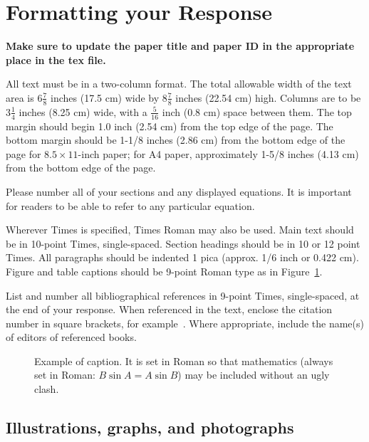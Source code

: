 \documentclass[rebuttal]{cvpr}
\begin{document}
\section{Formatting your Response}

{\bf Make sure to update the paper title and paper ID in the appropriate place in the tex file.}

All text must be in a two-column format. The total allowable width of the text
area is $6\frac78$ inches (17.5 cm) wide by $8\frac78$ inches (22.54 cm) high.
Columns are to be $3\frac14$ inches (8.25 cm) wide, with a $\frac{5}{16}$ inch
(0.8 cm) space between them. The top margin should begin
1.0 inch (2.54 cm) from the top edge of the page.  The bottom margin should be
1-1/8 inches (2.86 cm) from the bottom edge of the page for $8.5 \times
11$-inch paper; for A4 paper, approximately 1-5/8 inches (4.13 cm) from the
bottom edge of the page.

Please number all of your sections and any displayed equations.  It is important
for readers to be able to refer to any particular equation.

Wherever Times is specified, Times Roman may also be used.  Main text should be
in 10-point Times, single-spaced. Section headings should be in 10 or 12 point
Times.  All paragraphs should be indented 1 pica (approx. 1/6 inch or 0.422
cm).  Figure and table captions should be 9-point Roman type as in
Figure~\ref{fig:onecol}.


List and number all bibliographical references in 9-point Times, single-spaced,
at the end of your response. When referenced in the text, enclose the citation
number in square brackets, for example~\cite{Authors14}.  Where appropriate,
include the name(s) of editors of referenced books.

\begin{figure}[t]
\begin{center}
\fbox{\rule{0pt}{1in} \rule{0.9\linewidth}{0pt}}
\end{center}
   \caption{Example of caption.  It is set in Roman so that mathematics
   (always set in Roman: $B \sin A = A \sin B$) may be included without an
   ugly clash.}
\label{fig:long}
\label{fig:onecol}
\end{figure}


\subsection{Illustrations, graphs, and photographs}
\end{document}
